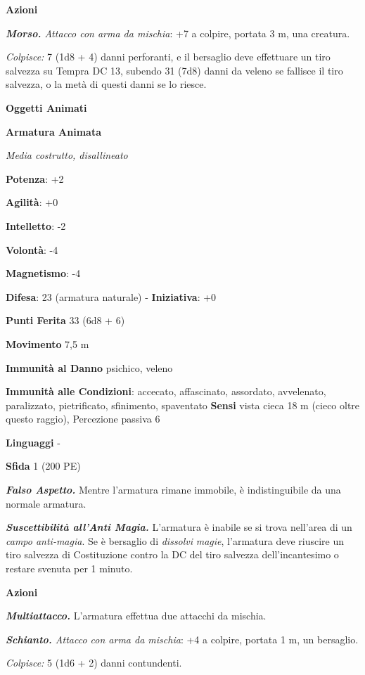 \begin{multicols}{2}
\smallskip\textbf{Azioni}

\emph{\textbf{Morso.} Attacco con arma da mischia}: +7 a colpire,
portata 3 m, una creatura.

\emph{Colpisce:} 7 (1d8 + 4) danni perforanti, e il bersaglio deve
effettuare un tiro salvezza su Tempra DC 13, subendo 31 (7d8)
danni da veleno se fallisce il tiro salvezza, o la metà di questi danni
se lo riesce.

\textbf{Oggetti Animati}

\textbf{Armatura Animata}

\emph{Media costrutto, disallineato}

\textbf{Potenza}: +2

\textbf{Agilità}: +0

\textbf{Intelletto}: -2

\textbf{Volontà}: -4

\textbf{Magnetismo}: -4

\textbf{Difesa}: 23 (armatura naturale) - \textbf{Iniziativa}: +0

\textbf{Punti Ferita} 33 (6d8 + 6)

\textbf{Movimento} 7,5 m

\textbf{Immunità al Danno} psichico, veleno

\textbf{Immunità alle Condizioni}: accecato, affascinato, assordato,
avvelenato, paralizzato, pietrificato, sfinimento, spaventato
\textbf{Sensi} vista cieca 18 m (cieco oltre questo raggio), Percezione
passiva 6

\textbf{Linguaggi} -

\textbf{Sfida} 1 (200 PE)\smallskip

\emph{\textbf{Falso Aspetto.}} Mentre l'armatura rimane immobile, è
indistinguibile da una normale armatura.

\emph{\textbf{Suscettibilità all'Anti Magia.}} L'armatura è inabile se
si trova nell'area di un \emph{campo anti-magia}. Se è bersaglio di
\emph{dissolvi} \emph{magie}, l'armatura deve riuscire un tiro salvezza
di Costituzione contro la DC del tiro salvezza dell'incantesimo o
restare svenuta per 1 minuto.

\smallskip\textbf{Azioni}

\emph{\textbf{Multiattacco.}} L'armatura effettua due attacchi da
mischia.

\emph{\textbf{Schianto.} Attacco con arma da mischia}: +4 a colpire,
portata 1 m, un bersaglio.

\emph{Colpisce:} 5 (1d6 + 2) danni contundenti.


\end{multicols}
